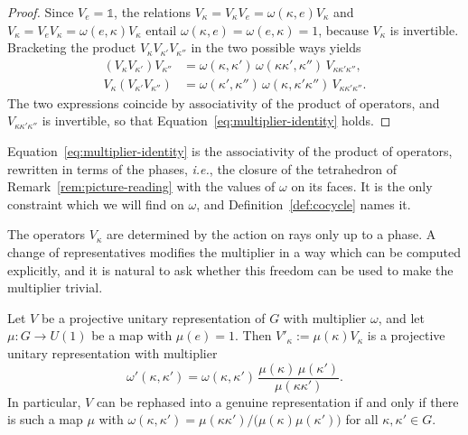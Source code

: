 \begin{proof}
	Since $V_e=\mathbb{1}$, the relations $V_\kappa=V_\kappa V_e=\omega(\kappa,e)V_\kappa$ and $V_\kappa=V_eV_\kappa=\omega(e,\kappa)V_\kappa$ entail $\omega(\kappa,e)=\omega(e,\kappa)=1$, because $V_\kappa$ is invertible. Bracketing the product $V_\kappa V_{\kappa'}V_{\kappa''}$ in the two possible ways yields
	\begin{align*}
		(V_\kappa V_{\kappa'})V_{\kappa''}&=\omega(\kappa,\kappa')\,\omega(\kappa\kappa',\kappa'')\,V_{\kappa\kappa'\kappa''},\\
		V_\kappa(V_{\kappa'}V_{\kappa''})&=\omega(\kappa',\kappa'')\,\omega(\kappa,\kappa'\kappa'')\,V_{\kappa\kappa'\kappa''}.
	\end{align*}
	The two expressions coincide by associativity of the product of operators, and $V_{\kappa\kappa'\kappa''}$ is invertible, so that Equation~\eqref{eq:multiplier-identity} holds.
\end{proof}

\noindent Equation~\eqref{eq:multiplier-identity} is the associativity of the product of operators, rewritten in terms of the phases, \textit{i.e.}, the closure of the tetrahedron of Remark~\ref{rem:picture-reading} with the values of $\omega$ on its faces. It is the only constraint which we will find on $\omega$, and Definition~\ref{def:cocycle} names it.

The operators $V_\kappa$ are determined by the action on rays only up to a phase. A change of representatives modifies the multiplier in a way which can be computed explicitly, and it is natural to ask whether this freedom can be used to make the multiplier trivial.

\begin{proposition}[Rephasing]\label{prop:rephasing}
	Let $V$ be a projective unitary representation of $G$ with multiplier $\omega$, and let $\mu:G\to U(1)$ be a map with $\mu(e)=1$. Then $V'_\kappa:=\mu(\kappa)V_\kappa$ is a projective unitary representation with multiplier
	\begin{equation}\label{eq:rephasing}
		\omega'(\kappa,\kappa')=\omega(\kappa,\kappa')\,\frac{\mu(\kappa)\,\mu(\kappa')}{\mu(\kappa\kappa')}.
	\end{equation}
	In particular, $V$ can be rephased into a genuine representation if and only if there is such a map $\mu$ with $\omega(\kappa,\kappa')=\mu(\kappa\kappa')\big/\big(\mu(\kappa)\mu(\kappa')\big)$ for all $\kappa,\kappa'\in G$.
\end{proposition}

